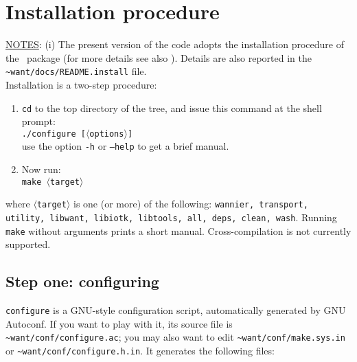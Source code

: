 
\thispagestyle{empty}
\section{Installation procedure}\label{section:install}

\noindent \underline {NOTES}: (i) The present version of the code
adopts the installation procedure of the \PWSCF\ package (for more details see
also \PWSCFURL). 
Details are also reported in the {\tt \~{}want/docs/README.install} file. \\

\noindent Installation is a two-step procedure:
%
%
\begin{enumerate}
\item \texttt{cd} to the top directory of the \WANT{} tree,
and issue this command at the shell
prompt:\\
{\tt ./configure [$\langle$options$\rangle$] } \\
use the option {\tt -h} or {\tt --help} to get a brief manual.
\item Now run:\\
     {\tt make $\langle$target$\rangle$ }
\end{enumerate}
%
%
where {\tt $\langle$target$\rangle$} is one (or more) of the following:
{\tt wannier, transport, utility, libwant, libiotk, libtools, all, deps, clean, wash}. Running
{\tt make} without arguments prints a short manual.
Cross-compilation is not currently supported.


\subsection{Step one: configuring} {\tt configure} is a GNU-style configuration script,
automatically generated by GNU Autoconf. If you want to play
with it, its source file is {\tt \~{}want/conf/configure.ac}; you may also
want to edit {\tt \~{}want/conf/make.sys.in} or {\tt \~{}want/conf/configure.h.in}. 
It generates the following files: \\

